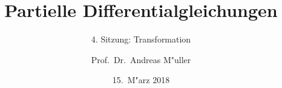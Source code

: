 \documentclass{beamer}
\title[]{Partielle Differentialgleichungen}
\subtitle{4. Sitzung: Transformation}
\date[15.~M"arz 2018]{15.~M"arz 2018}
\author{Prof.~Dr.~Andreas M"uller}
\begin{document}
\begin{frame}
\titlepage
\end{frame}


\end{document}
